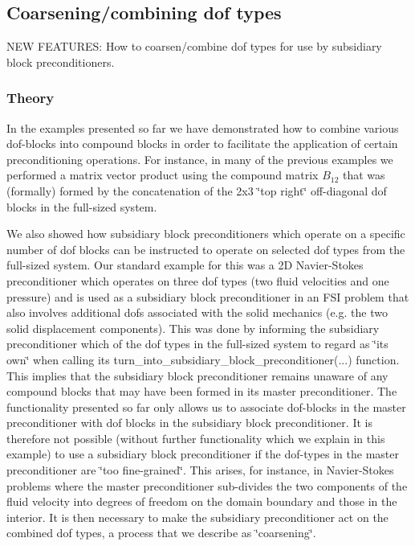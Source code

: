 \hypertarget{index_coarse_two_plus_two_plus_one}{}\subsection{Coarsening/combining dof types}\label{index_coarse_two_plus_two_plus_one}
N\+EW F\+E\+A\+T\+U\+R\+ES\+: How to coarsen/combine dof types for use by subsidiary block preconditioners.\hypertarget{index_coarse_two_plus_two_plus_one_theory}{}\subsubsection{Theory}\label{index_coarse_two_plus_two_plus_one_theory}
In the examples presented so far we have demonstrated how to combine various dof-\/blocks into compound blocks in order to facilitate the application of certain preconditioning operations. For instance, in many of the previous examples we performed a matrix vector product using the compound matrix $ B_{12} $ that was (formally) formed by the concatenation of the 2x3 \char`\"{}top right\char`\"{} off-\/diagonal dof blocks in the full-\/sized system.

We also showed how subsidiary block preconditioners which operate on a specific number of dof blocks can be instructed to operate on selected dof types from the full-\/sized system. Our standard example for this was a 2D Navier-\/\+Stokes preconditioner which operates on three dof types (two fluid velocities and one pressure) and is used as a subsidiary block preconditioner in an F\+SI problem that also involves additional dofs associated with the solid mechanics (e.\+g. the two solid displacement components). This was done by informing the subsidiary preconditioner which of the dof types in the full-\/sized system to regard as \char`\"{}its own\char`\"{} when calling its {\ttfamily turn\+\_\+into\+\_\+subsidiary\+\_\+block\+\_\+preconditioner}(...) function. This implies that the subsidiary block preconditioner remains unaware of any compound blocks that may have been formed in its master preconditioner. The functionality presented so far only allows us to associate dof-\/blocks in the master preconditioner with dof blocks in the subsidiary block preconditioner. It is therefore not possible (without further functionality which we explain in this example) to use a subsidiary block preconditioner if the dof-\/types in the master preconditioner are \char`\"{}too fine-\/grained\char`\"{}. This arises, for instance, in Navier-\/\+Stokes problems where the master preconditioner sub-\/divides the two components of the fluid velocity into degrees of freedom on the domain boundary and those in the interior. It is then necessary to make the subsidiary preconditioner act on the combined dof types, a process that we describe as \char`\"{}coarsening\char`\"{}.

